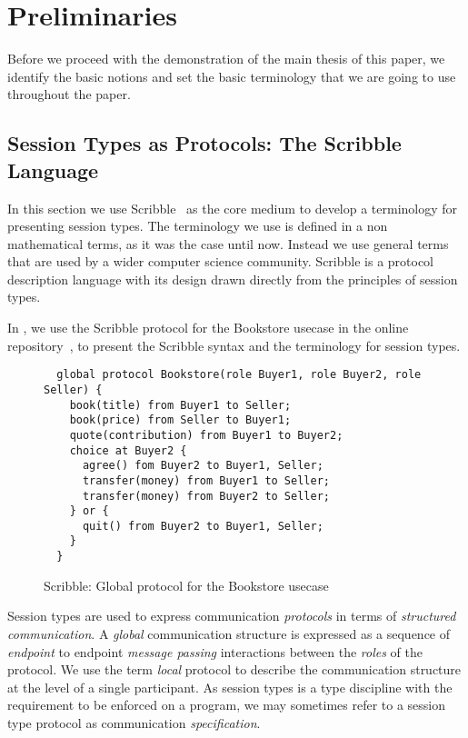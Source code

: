 \section{Preliminaries}

Before we proceed with the demonstration of the main thesis
of this paper, we identify the basic notions and set the basic
terminology that we are going to use throughout the paper.

\subsection{Session Types as Protocols: The Scribble Language}

In this section we use Scribble~\cite{scribble} as the core
medium to develop a terminology for presenting session types.
The terminology we use is defined in a non mathematical terms,
as it was the case until now. Instead we use general terms
that are used by a wider computer science community.
Scribble is a protocol description language with its design
drawn directly from the principles of session types.

In , we use the Scribble protocol for the
Bookstore usecase in the online repository~\cite{usecase_repository},
to present the Scribble syntax and the terminology for session types.


\begin{figure}[t]
\begin{lstlisting}
  global protocol Bookstore(role Buyer1, role Buyer2, role Seller) {
    book(title) from Buyer1 to Seller;
    book(price) from Seller to Buyer1;
    quote(contribution) from Buyer1 to Buyer2;
    choice at Buyer2 {
      agree() fom Buyer2 to Buyer1, Seller;
      transfer(money) from Buyer1 to Seller;
      transfer(money) from Buyer2 to Seller;
    } or {
      quit() from Buyer2 to Buyer1, Seller;
    }
  }
\end{lstlisting}
\caption{Scribble: Global protocol for the Bookstore usecase}
\end{figure}

Session types are used to express communication
{\em protocols} in terms of {\em structured communication}.
A {\em global} communication structure is expressed 
as a sequence of {\em endpoint} to endpoint {\em message passing}
interactions between the {\em roles} of the protocol.
We use the term {\em local} protocol to describe
the communication structure at the level of a single participant.
As session types is a type discipline with the requirement to
be enforced on a program, we may sometimes refer to a session type
protocol as communication {\em specification}.

